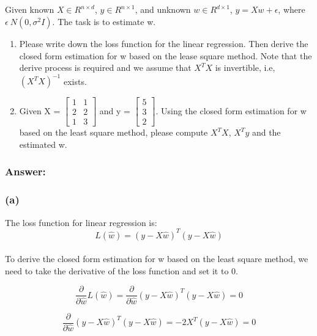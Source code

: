 \documentclass{article}
\begin{document}
\subsection{}
Given known $X \in R^{n \times d}$, $y \in R^{n \times 1}$, and unknown $w \in R^{d \times 1}$, $y = Xw + \epsilon$, where $\epsilon ~ N(0, \sigma^2I)$. The task is to estimate w.
\begin{enumerate}[label= (\alph*)]
    \item Please write down the loss function for the linear regression. Then derive the closed form estimation for w based on the lease square method. Note that the derive process is required and we assume that $X^{T}X$ is invertible, i.e, ${(X^{T}X)}^{-1}$ exists.
    \item Given X = $\begin{bmatrix} 1 & 1 \\ 2 & 2 \\ 1 & 3 \end{bmatrix}$ and y = $\begin{bmatrix} 5 \\ 3 \\ 2 \end{bmatrix}$. Using the closed form estimation for w based on the least square method, please compute $X^{T}X$, $X^{T}y$ and the estimated w.
\end{enumerate}

\subsubsection{Answer:}

\subsubsection*{(a)}
The loss function for linear regression is:
\begin{equation}
    L(\hat{w}) = {(y - X\hat{w})}^T(y - X\hat{w})
\end{equation}
\\
To derive the closed form estimation for w based on the least square method, we need to take the derivative of the loss function and set it to 0.

\begin{equation}
    \frac{\partial}{\partial \hat{w}} L(\hat{w}) = \frac{\partial}{\partial \hat{w}} {(y - X\hat{w})}^T(y - X\hat{w}) = 0
\end{equation}

\begin{equation}
    \frac{\partial}{\partial \hat{w}} {(y - X\hat{w})}^T(y - X\hat{w}) = -2X^T(y - X\hat{w}) = 0
\end{equation}
\end{document}

